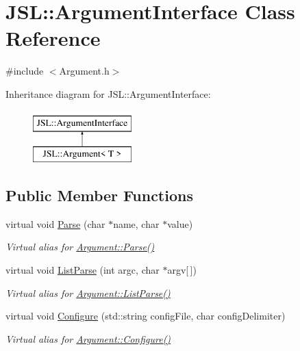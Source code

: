 \hypertarget{classJSL_1_1ArgumentInterface}{}\section{J\+SL\+:\+:Argument\+Interface Class Reference}
\label{classJSL_1_1ArgumentInterface}


{\ttfamily \#include $<$Argument.\+h$>$}

Inheritance diagram for J\+SL\+:\+:Argument\+Interface\+:\begin{figure}[H]
\begin{center}
\leavevmode
\includegraphics[height=2.000000cm]{classJSL_1_1ArgumentInterface}
\end{center}
\end{figure}
\subsection*{Public Member Functions}
\begin{DoxyCompactItemize}
\item 
virtual void \hyperlink{classJSL_1_1ArgumentInterface_a28b487f7a4fa6e721ed6629abe2073f2}{Parse} (char $\ast$name, char $\ast$value)
\begin{DoxyCompactList}\small\item\em Virtual alias for \hyperlink{classJSL_1_1Argument_a8984e7ce23155259d90a3e98170f36e0}{Argument\+::\+Parse()} \end{DoxyCompactList}\item 
virtual void \hyperlink{classJSL_1_1ArgumentInterface_a256b5bd88b5f6638353f108c48f3ee65}{List\+Parse} (int argc, char $\ast$argv\mbox{[}$\,$\mbox{]})
\begin{DoxyCompactList}\small\item\em Virtual alias for \hyperlink{classJSL_1_1Argument_aa2b18bb35e90f91e224a06d60835053a}{Argument\+::\+List\+Parse()} \end{DoxyCompactList}\item 
virtual void \hyperlink{classJSL_1_1ArgumentInterface_aac7c3106f99c407e625b9bc6a6c8c446}{Configure} (std\+::string config\+File, char config\+Delimiter)
\begin{DoxyCompactList}\small\item\em Virtual alias for \hyperlink{classJSL_1_1Argument_aa626ff37dbebaf0501614dc625a76383}{Argument\+::\+Configure()} \end{DoxyCompactList}\end{DoxyCompactItemize}
